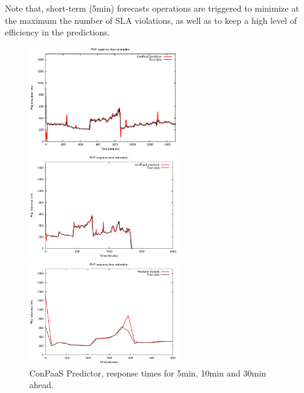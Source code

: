 Note that, short-term (5min) forecasts operations are triggered to minimize at the maximum the number of SLA violations, as well as to keep a high level of efficiency in the predictions. 


\begin{figure}[htb]
	\begin{minipage}[b]{0.3\linewidth}
		\includegraphics[height=4.5cm]{images/prediction_conpaas_6min.eps}
		\vspace{-4mm}
	\end{minipage}
	\hfill
	\begin{minipage}[b]{0.3\linewidth}
		\includegraphics[height=4.5cm]{images/prediction_conpaas_10min}
		\vspace{-4mm}
	\end{minipage}
	\hfill
	\begin{minipage}[b]{0.3\linewidth}
		\includegraphics[height=4.5cm]{images/prediction_conpaas_30min}
		\vspace{-4mm}
	\end{minipage}
\caption{ConPaaS Predictor, response times for 5min, 10min and 30min ahead.}
\label{fig:vm_performance}
\end{figure}

